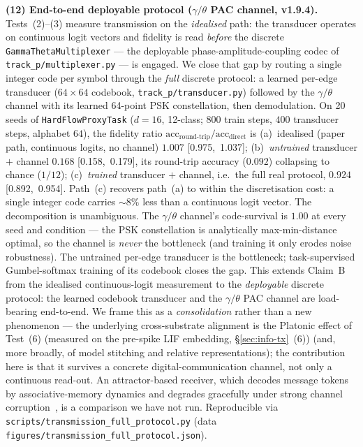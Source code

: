 \documentclass[10pt,twocolumn]{article}
\begin{document}
\textbf{(12) End-to-end deployable protocol ($\gamma/\theta$ PAC
channel, v1.9.4).} Tests~(2)--(3) measure transmission on the
\emph{idealised} path: the transducer operates on continuous logit
vectors and fidelity is read \emph{before} the discrete
\texttt{GammaThetaMultiplexer} --- the deployable phase-amplitude-coupling
codec of \texttt{track\_p/multiplexer.py} --- is engaged. We close that
gap by routing a single integer code per symbol through the \emph{full}
discrete protocol: a learned per-edge transducer ($64{\times}64$
codebook, \texttt{track\_p/transducer.py}) followed by the
$\gamma/\theta$ channel with its learned 64-point PSK constellation,
then demodulation. On 20 seeds of \texttt{HardFlowProxyTask} ($d{=}16$,
12-class; $800$ train steps, $400$ transducer steps, alphabet $64$), the
fidelity ratio
$\text{acc}_{\text{round-trip}} / \text{acc}_{\text{direct}}$ is
(a)~idealised (paper path, continuous logits, no channel)
$1.007$ \mbox{[0.975, 1.037]};
(b)~\emph{untrained} transducer $+$ channel
$0.168$ \mbox{[0.158, 0.179]}, its round-trip accuracy ($0.092$)
collapsing to chance ($1/12$);
(c)~\emph{trained} transducer $+$ channel, i.e.\ the full real protocol,
$\mathbf{0.924}$ \mbox{[0.892, 0.954]}.
Path~(c) recovers path~(a) to within the discretisation cost: a single
integer code carries $\sim 8\%$ less than a continuous logit vector. The
decomposition is unambiguous. The $\gamma/\theta$ channel's
code-survival is $1.00$ at every seed and condition --- the PSK
constellation is analytically max-min-distance optimal, so the channel
is \emph{never} the bottleneck (and training it only erodes noise
robustness). The untrained per-edge transducer is the bottleneck;
task-supervised Gumbel-softmax training of its codebook closes the gap.
This extends Claim~B from the idealised continuous-logit measurement to
the \emph{deployable} discrete protocol: the learned codebook transducer
and the $\gamma/\theta$ PAC channel are load-bearing end-to-end. We
frame this as a \emph{consolidation} rather than a new phenomenon --- the
underlying cross-substrate alignment is the Platonic effect of Test~(6)
(measured on the pre-spike LIF embedding, \S\ref{sec:info-tx}~(6))
(and, more broadly, of model stitching and relative representations);
the contribution here is that it survives a concrete
digital-communication channel, not only a continuous read-out.
An attractor-based receiver, which decodes message tokens by associative-memory dynamics and degrades gracefully under strong channel corruption~\cite{agliari2026dense}, is a comparison we have not run.
Reproducible via \texttt{scripts/transmission\_full\_protocol.py} (data
\texttt{figures/transmission\_full\_protocol.json}).
\end{document}
